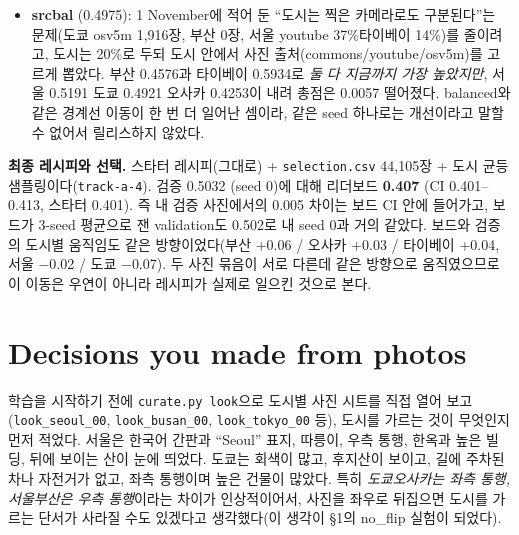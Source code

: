 \documentclass[11pt]{article}
\begin{document}
\begin{itemize}
  배치 32로 두 배 더 자주 넣어봤다. 오사카만 0.016 올랐고 네 도시는 내렸으며(서울 $-$0.016,
  도쿄 $-$0.027), 마지막 학습 손실도 0.810으로 배치 64의 0.767보다 높았다. 부족한 것은
  학습 횟수가 아니라는 뜻이므로 배치는 64로 되돌렸다.
\item \textbf{srcbal} (0.4975): 1 November에 적어 둔 ``도시는 찍은 카메라로도
  구분된다''는 문제(도쿄 osv5m 1,916장, 부산 0장, 서울 youtube 37\%\textperiodcentered{}타이베이 14\%)를
  줄이려고, 도시는 20\%로 두되 도시 안에서 사진 출처(commons/youtube/osv5m)를 고르게
  뽑았다. 부산 0.4576과 타이베이 0.5934로 \emph{둘 다 지금까지 가장 높았지만}, 서울
  0.5191 \textperiodcentered{} 도쿄 0.4921 \textperiodcentered{} 오사카 0.4253이 내려 총점은 0.0057 떨어졌다. balanced와 같은
  경계선 이동이 한 번 더 일어난 셈이라, 같은 seed 하나로는 개선이라고 말할 수 없어서
  릴리스하지 않았다.
\end{itemize}

\textbf{최종 레시피와 선택.} 스타터 레시피(그대로) + \texttt{selection.csv} 44,105장 +
도시 균등 샘플링이다(\texttt{track-a-4}). 검증 0.5032 (seed 0)에 대해 리더보드
\textbf{0.407} (CI 0.401--0.413, 스타터 0.401). 즉 내 검증 사진에서의 0.005 차이는 보드
CI 안에 들어가고, 보드가 3-seed 평균으로 잰 validation도 0.502로 내 seed 0과 거의 같았다.
보드와 검증의 도시별 움직임도 같은 방향이었다(부산 +0.06 / 오사카 +0.03 / 타이베이
+0.04, 서울 $-$0.02 / 도쿄 $-$0.07). 두 사진 묶음이 서로 다른데 같은 방향으로 움직였으므로
이 이동은 우연이 아니라 레시피가 실제로 일으킨 것으로 본다.

\section*{Decisions you made from photos}

\begin{center}
\end{center}

학습을 시작하기 전에 \texttt{curate.py look}으로 도시별 사진 시트를 직접 열어 보고
(\texttt{look\_seoul\_00}, \texttt{look\_busan\_00}, \texttt{look\_tokyo\_00} 등), 도시를
가르는 것이 무엇인지 먼저 적었다. 서울은 한국어 간판과 ``Seoul'' 표지, 따릉이, 우측
통행, 한옥과 높은 빌딩, 뒤에 보이는 산이 눈에 띄었다. 도쿄는 회색이 많고, 후지산이
보이고, 길에 주차된 차나 자전거가 없고, 좌측 통행이며 높은 건물이 많았다. 특히
\emph{도쿄\textperiodcentered{}오사카는 좌측 통행, 서울\textperiodcentered{}부산은 우측 통행}이라는 차이가 인상적이어서,
사진을 좌우로 뒤집으면 도시를 가르는 단서가 사라질 수도 있겠다고 생각했다(이 생각이
\S1의 no\_flip 실험이 되었다).
\end{document}
